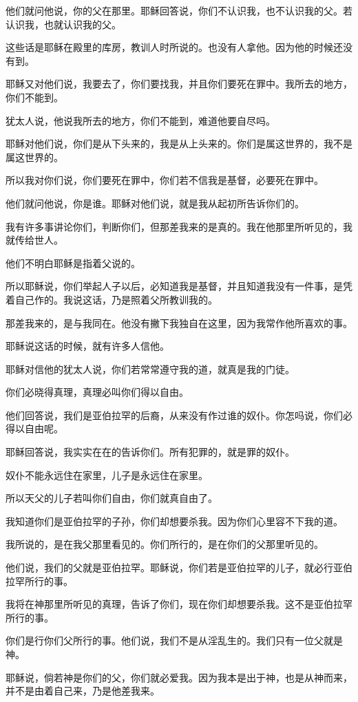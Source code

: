 \documentclass[12pt,oneside]{book}
\begin{document}
他们就问他说，你的父在那里。耶稣回答说，你们不认识我，也不认识我的父。若认识我，也就认识我的父。

这些话是耶稣在殿里的库房，教训人时所说的。也没有人拿他。因为他的时候还没有到。

耶稣又对他们说，我要去了，你们要找我，并且你们要死在罪中。我所去的地方，你们不能到。

犹太人说，他说我所去的地方，你们不能到，难道他要自尽吗。

耶稣对他们说，你们是从下头来的，我是从上头来的。你们是属这世界的，我不是属这世界的。

所以我对你们说，你们要死在罪中，你们若不信我是基督，必要死在罪中。

他们就问他说，你是谁。耶稣对他们说，就是我从起初所告诉你们的。

我有许多事讲论你们，判断你们，但那差我来的是真的。我在他那里所听见的，我就传给世人。

他们不明白耶稣是指着父说的。

所以耶稣说，你们举起人子以后，必知道我是基督，并且知道我没有一件事，是凭着自己作的。我说这话，乃是照着父所教训我的。

那差我来的，是与我同在。他没有撇下我独自在这里，因为我常作他所喜欢的事。

耶稣说这话的时候，就有许多人信他。

耶稣对信他的犹太人说，你们若常常遵守我的道，就真是我的门徒。

你们必晓得真理，真理必叫你们得以自由。

他们回答说，我们是亚伯拉罕的后裔，从来没有作过谁的奴仆。你怎吗说，你们必得以自由呢。

耶稣回答说，我实实在在的告诉你们。所有犯罪的，就是罪的奴仆。

奴仆不能永远住在家里，儿子是永远住在家里。

所以天父的儿子若叫你们自由，你们就真自由了。

我知道你们是亚伯拉罕的子孙，你们却想要杀我。因为你们心里容不下我的道。

我所说的，是在我父那里看见的。你们所行的，是在你们的父那里听见的。

他们说，我们的父就是亚伯拉罕。耶稣说，你们若是亚伯拉罕的儿子，就必行亚伯拉罕所行的事。

我将在神那里所听见的真理，告诉了你们，现在你们却想要杀我。这不是亚伯拉罕所行的事。

你们是行你们父所行的事。他们说，我们不是从淫乱生的。我们只有一位父就是神。

耶稣说，倘若神是你们的父，你们就必爱我。因为我本是出于神，也是从神而来，并不是由着自己来，乃是他差我来。
\end{document}
